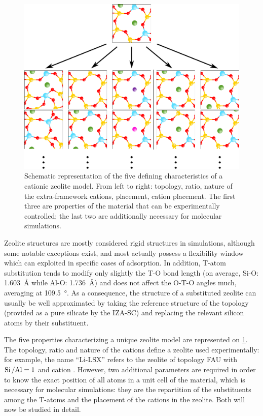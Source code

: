 \documentclass[main.tex]{subfiles}
\begin{document}
\begin{figure}
	\centering
	\includegraphics[width=\linewidth]{figures/cations/zeolites.pdf}
	\caption{Schematic representation of the five defining characteristics of a cationic zeolite model. From left to right: topology, \SiAl ratio, nature of the extra-framework cations,  placement, cation placement. The first three are properties of the material that can be experimentally controlled; the last two are additionally necessary for molecular simulations.}\label{fig:zeolite_characteristics}
\end{figure}

Zeolite structures are mostly considered rigid structures in simulations, although some notable exceptions exist\autocite{RHOFlexibility,MFIFlexibility}, and most actually possess a flexibility window\autocite{ZeoliteFlexibility} which can exploited in specific cases of adsorption\autocite{ZeoliteInducedFlexibility}. In addition, T-atom substitution tends to modify only slightly the T-O bond length (on average, Si-O: \qty{1.603}{\angstrom} while Al-O: \qty{1.736}{\angstrom}) and does not affect the O-T-O angles much, averaging at \qty{109.5}{\degree}\autocite{ZeoliteBondAngles}. As a consequence, the structure of a substituted zeolite can usually be well approximated by taking the reference structure of the topology (provided as a pure silicate by the IZA-SC) and replacing the relevant silicon atoms by their substituent.

The five properties characterizing a unique zeolite model are represented on \cref{fig:zeolite_characteristics}. The topology, \SiAl ratio and nature of the cations define a zeolite used experimentally: for example, the name ``Li-LSX'' refers to the zeolite of topology FAU with $\mbox{Si\,/Al} = 1$ and cation . However, two additional parameters are required in order to know the exact position of all atoms in a unit cell of the material, which is necessary for molecular simulations: they are the repartition of the substituents among the T-atoms and the placement of the cations in the zeolite. Both will now be studied in detail.
\end{document}

